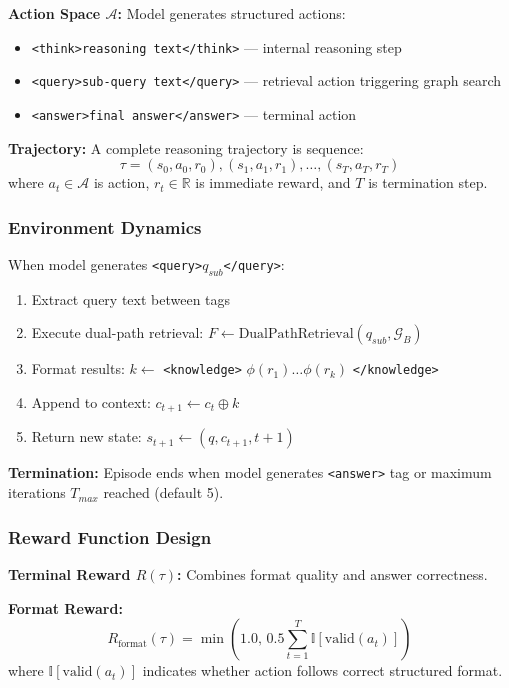 \documentclass[11pt,a4paper]{article}
\begin{document}
\textbf{Action Space $\mathcal{A}$:} Model generates structured actions:
\begin{itemize}
    \item \texttt{<think>reasoning text</think>} --- internal reasoning step
    \item \texttt{<query>sub-query text</query>} --- retrieval action triggering graph search
    \item \texttt{<answer>final answer</answer>} --- terminal action
\end{itemize}

\textbf{Trajectory:} A complete reasoning trajectory is sequence:
\begin{equation}
\tau = (s_0, a_0, r_0), (s_1, a_1, r_1), \ldots, (s_T, a_T, r_T)
\end{equation}
where $a_t \in \mathcal{A}$ is action, $r_t \in \mathbb{R}$ is immediate reward, and $T$ is termination step.

\subsubsection{Environment Dynamics}

When model generates \texttt{<query>}$q_{sub}$\texttt{</query>}:
\begin{enumerate}
    \item Extract query text between tags
    \item Execute dual-path retrieval: $F \leftarrow \text{DualPathRetrieval}(q_{sub}, \mathcal{G}_B)$
    \item Format results: $k \leftarrow$ \texttt{<knowledge>} $\phi(r_1) \ldots \phi(r_k)$ \texttt{</knowledge>}
    \item Append to context: $c_{t+1} \leftarrow c_t \oplus k$
    \item Return new state: $s_{t+1} \leftarrow (q, c_{t+1}, t+1)$
\end{enumerate}

\textbf{Termination:} Episode ends when model generates \texttt{<answer>} tag or maximum iterations $T_{max}$ reached (default 5).

\subsubsection{Reward Function Design}

\textbf{Terminal Reward $R(\tau)$:} Combines format quality and answer correctness.

\textbf{Format Reward:}
\begin{equation}
R_{\text{format}}(\tau) = \min\left(1.0, \, 0.5 \sum_{t=1}^T \mathbb{I}[\text{valid}(a_t)]\right)
\end{equation}
where $\mathbb{I}[\text{valid}(a_t)]$ indicates whether action follows correct structured format.
\end{document}
